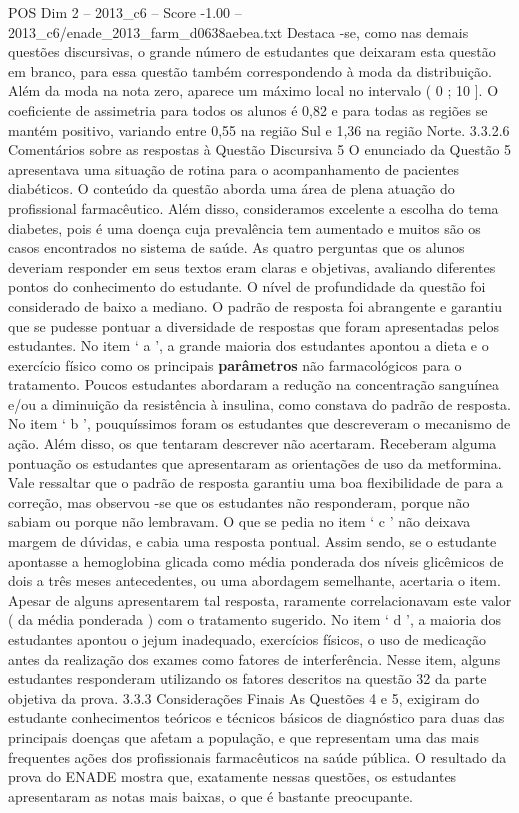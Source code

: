 \begin{textsample}{POS Dim 2 – 2013\_c6 – Score -1.00 – 2013\_c6/enade\_2013\_farm\_d0638aebea.txt}
Destaca -se, como nas demais questões discursivas, o grande número de estudantes que deixaram esta questão em branco, para essa questão também correspondendo à moda da distribuição.
Além da moda na nota zero, aparece um máximo local no intervalo ( 0 ; 10 ].
O coeficiente de assimetria para todos os alunos é 0,82 e para todas as regiões se mantém positivo, variando entre 0,55 na região Sul e 1,36 na região Norte. 3.3.2.6 Comentários sobre as respostas à Questão Discursiva 5 O enunciado da Questão 5 apresentava uma situação de rotina para o acompanhamento de pacientes diabéticos.
O conteúdo da questão aborda uma área de plena atuação do profissional farmacêutico.
Além disso, consideramos excelente a escolha do tema diabetes, pois é uma doença cuja prevalência tem aumentado e muitos são os casos encontrados no sistema de saúde.
As quatro perguntas que os alunos deveriam responder em seus textos eram claras e objetivas, avaliando diferentes pontos do conhecimento do estudante.
O nível de profundidade da questão foi considerado de baixo a mediano.
O padrão de resposta foi abrangente e garantiu que se pudesse pontuar a diversidade de respostas que foram apresentadas pelos estudantes.
No item ‘ a ’, a grande maioria dos estudantes apontou a dieta e o exercício físico como os principais \textbf{parâmetros} não farmacológicos para o tratamento.
Poucos estudantes abordaram a redução na concentração sanguínea e/ou a diminuição da resistência à insulina, como constava do padrão de resposta.
No item ‘ b ’, pouquíssimos foram os estudantes que descreveram o mecanismo de ação.
Além disso, os que tentaram descrever não acertaram.
Receberam alguma pontuação os estudantes que apresentaram as orientações de uso da metformina.
Vale ressaltar que o padrão de resposta garantiu uma boa flexibilidade de para a correção, mas observou -se que os estudantes não responderam, porque não sabiam ou porque não lembravam.
O que se pedia no item ‘ c ’ não deixava margem de dúvidas, e cabia uma resposta pontual.
Assim sendo, se o estudante apontasse a hemoglobina glicada como média ponderada dos níveis glicêmicos de dois a três meses antecedentes, ou uma abordagem semelhante, acertaria o item.
Apesar de alguns apresentarem tal resposta, raramente correlacionavam este valor ( da média ponderada ) com o tratamento sugerido.
No item ‘ d ’, a maioria dos estudantes apontou o jejum inadequado, exercícios físicos, o uso de medicação antes da realização dos exames como fatores de interferência.
Nesse item, alguns estudantes responderam utilizando os fatores descritos na questão 32 da parte objetiva da prova. 3.3.3 Considerações Finais As Questões 4 e 5, exigiram do estudante conhecimentos teóricos e técnicos básicos de diagnóstico para duas das principais doenças que afetam a população, e que representam uma das mais frequentes ações dos profissionais farmacêuticos na saúde pública.
O resultado da prova do ENADE mostra que, exatamente nessas questões, os estudantes apresentaram as notas mais baixas, o que é bastante preocupante.

\end{textsample}
